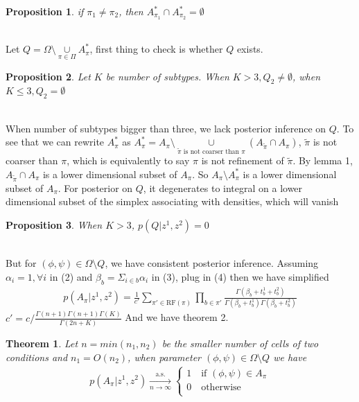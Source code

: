 \documentclass[11pt]{amsart}
\newtheorem{theorem}{Theorem}
\newtheorem{prop}{Proposition}
\begin{document}
\begin{prop}
if $\pi_1 \neq \pi_2$, then $A_{\pi_1}^*\cap A_{\pi_2}^* = \emptyset$
\end{prop}
\hfill\\
Let $Q = \Omega\setminus \underset{\pi\in \Pi}\cup A_\pi^*$, first thing to check is whether $Q$ exists.\\
\begin{prop}
Let $K$ be number of subtypes. When $K >  3, Q_2 \neq \emptyset$, when $K \leq 3, Q_2 = \emptyset$
\end{prop}
\hfill\\
When number of subtypes bigger than three, we lack posterior inference on $Q$. To see that we can rewrite $A_\pi^*$ as $A_\pi^* = A_\pi\setminus \underset{\tilde{\pi} \text{ is not coarser than } \pi }\cup (A_{\tilde{\pi}}\cap A_\pi)$, $\tilde{\pi}$ is not coarser than $\pi$, which is equivalently to say $\pi$ is not refinement of $\tilde{\pi}$. By lemma 1, $A_{\tilde{\pi}}\cap A_\pi$ is a lower dimensional subset of $A_\pi$. So $A_\pi \setminus A_\pi^*$ is a lower dimensional subset of $A_\pi$. For posterior on $Q$, it degenerates to integral on a lower dimensional subset of the simplex associating with densities, which will vanish\\
\begin{prop}
When $K >  3$, $p(Q | z^1, z^2) = 0$
\end{prop}
\hfill\\
But for $(\phi, \psi)\in \Omega\setminus Q$, we have consistent posterior inference. Assuming $\alpha_i = 1, \forall i$ in (2) and $\beta_b = \Sigma_{i\in b} \alpha_i$ in (3), plug in (4) then we have simplified 
\begin{align}
p(A_\pi| z^1, z^2) = \frac{1}{c'}\sum_{\pi' \in \text{RF}(\pi)}\prod_{b\in \pi'}\frac{ \Gamma(\beta_b + t_b^1 + t_b^2)}{\Gamma(\beta_b + t_b^1)\Gamma(\beta_b + t_b^2)}
\end{align}
$c' = c/\frac{\Gamma(n + 1)\Gamma(n+1)\Gamma(K)}{\Gamma(2n + K)}$ And we have theorem 2.\\
\begin{theorem} Let $n = min(n_1, n_2)$ be the smaller number of cells of two conditions and $n_1 = O(n_2)$, when parameter $(\phi, \psi)\in \Omega\setminus Q $ we have 
\begin{eqnarray*}
    p(A_{\pi} | z^1, z^2) \xrightarrow[n\rightarrow\infty]{\text{a.s.}}\left\{
                \begin{array}{ll}
                 1 \quad \text{if }(\phi,\psi) \in A_\pi\\
                 0 \quad \text{otherwise}\\             
                \end{array}
              \right.
\end{eqnarray*}
\end{theorem}
\end{document}
